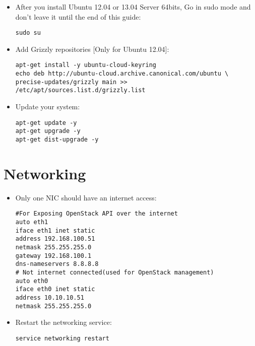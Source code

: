 \begin{itemize}
\item After you install Ubuntu 12.04 or 13.04 Server 64bits, Go in sudo mode and don't leave it until the end of this guide:

\begin{verbatim}
sudo su
\end{verbatim}


\item Add Grizzly repositories [Only for Ubuntu 12.04]:

\begin{verbatim}
apt-get install -y ubuntu-cloud-keyring  
echo deb http://ubuntu-cloud.archive.canonical.com/ubuntu \
precise-updates/grizzly main >> /etc/apt/sources.list.d/grizzly.list
\end{verbatim}


\item Update your system:

\begin{verbatim}
apt-get update -y  
apt-get upgrade -y  
apt-get dist-upgrade -y
\end{verbatim}


\end{itemize}

\section{Networking}
\label{networking}

\begin{itemize}
\item Only one NIC should have an internet access:

\begin{verbatim}
#For Exposing OpenStack API over the internet  
auto eth1  
iface eth1 inet static  
address 192.168.100.51  
netmask 255.255.255.0  
gateway 192.168.100.1  
dns-nameservers 8.8.8.8  
# Not internet connected(used for OpenStack management)  
auto eth0  
iface eth0 inet static  
address 10.10.10.51  
netmask 255.255.255.0
\end{verbatim}


\item Restart the networking service:

\begin{verbatim}
service networking restart        
\end{verbatim}


\end{itemize}


